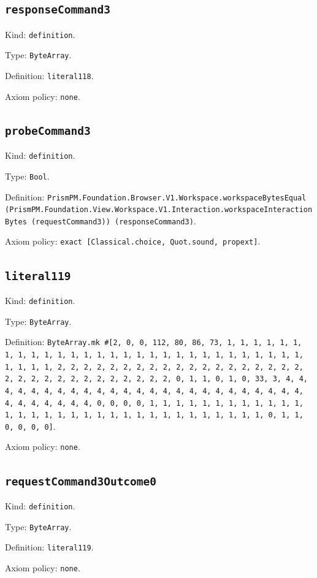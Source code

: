 \documentclass[11pt]{article}
\begin{document}
\subsection*{\texttt{responseCommand3}}
\noindent Kind: \texttt{definition}.\par
\noindent Type: \texttt{ByteArray}.\par
\noindent Definition: \texttt{literal118}.\par
\noindent Axiom policy: \texttt{none}.\par
\subsection*{\texttt{probeCommand3}}
\noindent Kind: \texttt{definition}.\par
\noindent Type: \texttt{Bool}.\par
\noindent Definition: \texttt{PrismPM.Foundation.Browser.V1.Workspace.workspaceBytesEqual (PrismPM.Foundation.View.Workspace.V1.Interaction.workspaceInteractionBytes (requestCommand3)) (responseCommand3)}.\par
\noindent Axiom policy: \texttt{exact [Classical.choice, Quot.sound, propext]}.\par
\subsection*{\texttt{literal119}}
\noindent Kind: \texttt{definition}.\par
\noindent Type: \texttt{ByteArray}.\par
\noindent Definition: \texttt{ByteArray.mk \#[2, 0, 0, 112, 80, 86, 73, 1, 1, 1, 1, 1, 1, 1, 1, 1, 1, 1, 1, 1, 1, 1, 1, 1, 1, 1, 1, 1, 1, 1, 1, 1, 1, 1, 1, 1, 1, 1, 1, 1, 2, 2, 2, 2, 2, 2, 2, 2, 2, 2, 2, 2, 2, 2, 2, 2, 2, 2, 2, 2, 2, 2, 2, 2, 2, 2, 2, 2, 2, 2, 2, 2, 0, 1, 1, 0, 1, 0, 33, 3, 4, 4, 4, 4, 4, 4, 4, 4, 4, 4, 4, 4, 4, 4, 4, 4, 4, 4, 4, 4, 4, 4, 4, 4, 4, 4, 4, 4, 4, 4, 4, 4, 0, 0, 0, 0, 1, 1, 1, 1, 1, 1, 1, 1, 1, 1, 1, 1, 1, 1, 1, 1, 1, 1, 1, 1, 1, 1, 1, 1, 1, 1, 1, 1, 1, 1, 1, 1, 0, 1, 1, 0, 0, 0, 0]}.\par
\noindent Axiom policy: \texttt{none}.\par
\subsection*{\texttt{requestCommand3Outcome0}}
\noindent Kind: \texttt{definition}.\par
\noindent Type: \texttt{ByteArray}.\par
\noindent Definition: \texttt{literal119}.\par
\noindent Axiom policy: \texttt{none}.\par
\end{document}
